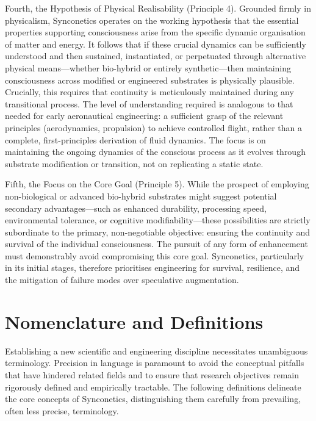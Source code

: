 \documentclass[10pt]{article}
\begin{document}
\begin{sloppypar}
  Fourth, the Hypothesis of Physical Realisability (Principle 4). Grounded firmly in physicalism, Synconetics operates on the working hypothesis that the essential properties supporting consciousness arise from the specific dynamic organisation of matter and energy. It follows that if these crucial dynamics can be sufficiently understood and then sustained, instantiated, or perpetuated through alternative physical means—whether bio-hybrid or entirely synthetic—then maintaining consciousness across modified or engineered substrates is physically plausible. Crucially, this requires that continuity is meticulously maintained during any transitional process. The level of understanding required is analogous to that needed for early aeronautical engineering: a sufficient grasp of the relevant principles (aerodynamics, propulsion) to achieve controlled flight, rather than a complete, first-principles derivation of fluid dynamics. The focus is on maintaining the ongoing dynamics of the conscious process as it evolves through substrate modification or transition, not on replicating a static state.

  Fifth, the Focus on the Core Goal (Principle 5). While the prospect of employing non-biological or advanced bio-hybrid substrates might suggest potential secondary advantages—such as enhanced durability, processing speed, environmental tolerance, or cognitive modifiability—these possibilities are strictly subordinate to the primary, non-negotiable objective: ensuring the continuity and survival of the individual consciousness. The pursuit of any form of enhancement must demonstrably avoid compromising this core goal. Synconetics, particularly in its initial stages, therefore prioritises engineering for survival, resilience, and the mitigation of failure modes over speculative augmentation.

  \section{Nomenclature and Definitions}
  \label{sec:nomenclature}

  Establishing a new scientific and engineering discipline necessitates unambiguous terminology. Precision in language is paramount to avoid the conceptual pitfalls that have hindered related fields and to ensure that research objectives remain rigorously defined and empirically tractable. The following definitions delineate the core concepts of Synconetics, distinguishing them carefully from prevailing, often less precise, terminology.


\end{sloppypar}
\end{document}
